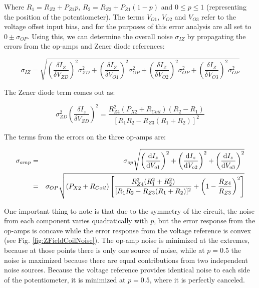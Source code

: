 \documentclass[PaulGanssle-Thesis.tex]{subfiles}
\begin{document}
Where $R_1 = R_{Z2} + P_{Z1}p$, $R_2 = R_{Z2} + P_{Z1}(1-p)$ and $0 \leq p \leq 1$ (representing the position of the potentiometer). The terms $V_{O1}$, $V_{O2}$ and $V_{O3}$ refer to the voltage offset input bias, and for the purposes of this error analysis are all set to $0 \pm \sigma_{OP}$. Using this, we can determine the overall noise $\sigma_{IZ}$ by propagating the errors from the op-amps and Zener diode references:

\begin{equation}
\sigma_{IZ} = \sqrt{\left(\frac{\delta I_{Z}}{\delta V_{ZD}}\right)^2\sigma_{ZD}^2 + \left(\frac{\delta I_{Z}}{\delta V_{O1}}\right)^2\sigma_{OP}^2 + \left(\frac{\delta I_{Z}}{\delta V_{O2}}\right)^2\sigma_{OP}^2 + \left(\frac{\delta I_{Z}}{\delta V_{O3}}\right)^2\sigma_{OP}^2}
\end{equation}

The Zener diode term comes out as:

\begin{equation}
\sigma_{ZD}^2\left(\frac{\delta I_z}{\delta V_{ZD}}\right)^2 = \frac{R_{Z4}^2(P_{X2} + R_{Coil})(R_2-R_1)}{[R_{1}R_{2} - R_{Z3}(R_1+R_2)]^2}
\end{equation}

The terms from the errors on the three op-amps are:

\begin{align}
\sigma_{amp} & = & \sigma_{op}\sqrt{\left(\frac{\mathrm{d} I_z}{\mathrm{d} V_{o1}}\right)^2 + \left(\frac{\mathrm{d} I_z}{\mathrm{d} V_{o2}}\right)^2 + \left(\frac{\mathrm{d} I_z}{\mathrm{d} V_{o3}}\right)^2} \\
& = & \sigma_{OP}\sqrt{(P_{X2} + R_{Coil})\left[\frac{R_{Z4}^2(R_1^2 + R_2^2)}{[R_1R_2 - R_{Z3}(R_1+R_2)]^2} + \left(1-\frac{R_{Z4}}{R_{Z3}}\right)^2\right]} \label{eqn:field.coil.OpAmpNoise}
\end{align}

One important thing to note is that due to the symmetry of the circuit, the noise from each component varies quadratically with $p$, but the error response from the op-amps is concave while the error response from the voltage reference is convex (see Fig. \ref{fig:ZFieldCoilNoise}). The op-amp noise is minimized at the extremes, because at those points there is only one source of noise, while at $p = 0.5$ the noise is maximized because there are equal contributions from two independent noise sources. Because the voltage reference provides identical noise to each side of the potentiometer, it is minimized at $p = 0.5$, where it is perfectly canceled.
\end{document}
